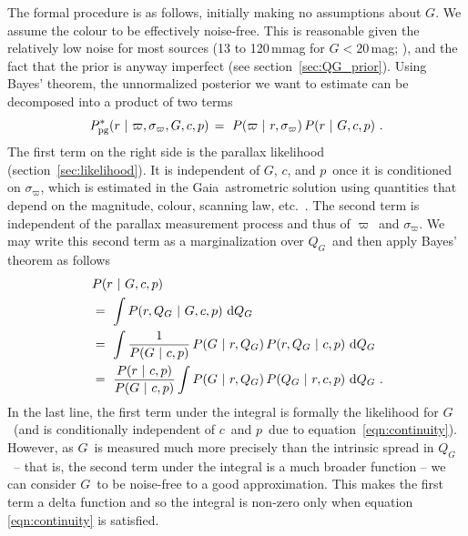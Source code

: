 \documentclass[twocolumn]{aastex62}
\providecommand{\deriv}{\ensuremath{\mathrm{d}}}
\providecommand{\given}{\ensuremath{\hspace{0.05em}\mid\hspace{0.05em}}}
\providecommand{\deriv}{\ensuremath{\mathrm{d}}}
\providecommand{\given}{\ensuremath{\hspace{0.01em}\mid\hspace{0.01em}}}
\providecommand{\gaia}{Gaia}
\providecommand{\gmag}{\ensuremath{G}}
\providecommand{\QG}{\ensuremath{Q_G}}
\providecommand{\cc}{\ensuremath{c}}
\providecommand{\parallax}{\ensuremath{\varpi}}
\providecommand{\sigparallax}{\ensuremath{\sigma_{\varpi}}}
\providecommand{\hp}{\ensuremath{p}}
\providecommand{\dist}{\ensuremath{r}}
\begin{document}
The formal procedure is as follows, initially making no assumptions about \gmag. We assume the colour to be effectively noise-free. This is reasonable given the relatively low noise for most sources (13 to 120\,mmag for $\gmag < 20$\,mag; \citealt{gedr3_release}), and the fact that the prior is anyway imperfect (see section~\ref{sec:QG_prior}).
Using Bayes' theorem, the unnormalized posterior we want to estimate can be decomposed into a product of two terms
\begin{equation}
  P_{\rm pg}^*(\dist \given \parallax, \sigparallax, \gmag, \cc, \hp) \,=\  P(\parallax \given \dist, \sigparallax) \, P(\dist \given \gmag, \cc, \hp) \ .
  \label{eqn:distpost_unnormalized}
\end{equation}
The first term on the right side is the parallax likelihood (section~\ref{sec:likelihood}). It is independent of \gmag, \cc, and \hp\ once it is conditioned on \sigparallax, which is estimated in the \gaia\ astrometric solution using quantities that depend on the magnitude, colour, scanning law, etc.\ \citep{lindegren_etal_gedr3_astrometry}. The second term is independent of the parallax measurement process and thus of \parallax\ and \sigparallax. We may write this second term as a marginalization over \QG\ and then apply Bayes' theorem as follows
\begin{alignat}{2}
  & P(\dist \given \gmag, \cc, \hp)  \label{eqn:distpost_part} \\
                                            \,&=\  \int P(\dist, \QG \given \gmag, \cc, \hp) \ \deriv\QG \nonumber \\
                                            \,&=\  \int \frac{1}{P(\gmag \given \cc, \hp)}  \, P(\gmag \given \dist, \QG) \, P(\dist, \QG \given \cc, \hp) \ \deriv\QG \nonumber \\
                                            \,&=\  \frac{P(\dist \given \cc, \hp)}{P(\gmag \given \cc, \hp)}  \int P(\gmag \given \dist, \QG) \, P(\QG \given \dist, \cc, \hp) \ \deriv\QG \ . \nonumber 
\end{alignat}
In the last line, the first term under the integral is formally the likelihood for \gmag\ (and is conditionally independent of \cc\ and \hp\ due to equation~\ref{eqn:continuity}). However, as \gmag\ is measured much more precisely than the intrinsic spread in \QG\ -- that is, the second term under the integral is a much broader function -- we can consider \gmag\ to be noise-free to a good approximation. This makes the first term a delta function and so 
the integral is non-zero only when equation \ref{eqn:continuity} is satisfied.
\end{document}
